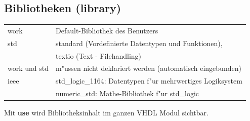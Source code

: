 \begin{minipage}[t]{0.59\textwidth}
	\subsection{Bibliotheken (library)}
	\begin{tabular}{ll}
		work & Default-Bibliothek des Benutzers \\
		std & standard (Vordefinierte Datentypen und Funktionen),\\
		& textio (Text -  Filehandling)\\
		work und std &m"ussen nicht deklariert werden (automatisch eingebunden)\\
		ieee & std\_logic\_1164: Datentypen f"ur mehrwertiges Logiksystem\\
		& numeric\_std: Mathe-Bibliothek f"ur std\_logic
	\end{tabular}
	Mit \textbf{use} wird Bibliotheksinhalt im ganzen VHDL Modul sichtbar.
\end{minipage}
\hfill
\begin{minipage}[t]{0.3\textwidth}
	
\end{minipage}

